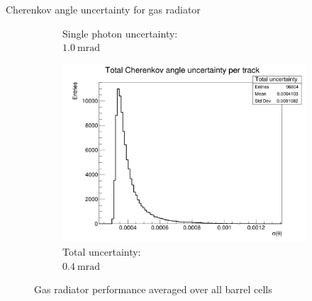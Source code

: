 \documentclass{beamer}
\begin{document}
\begin{frame}{Cherenkov angle uncertainty for gas radiator}
\begin{figure}
\begin{subfigure}{0.35\textwidth}
      \caption{Single photon uncertainty:\\ $\SI{1.0}{\milli\radian}$}
    \end{subfigure}%
    \begin{subfigure}{0.35\textwidth}
      \includegraphics[width = 1.0\textwidth]{Plots/TotalCherenkovUncertainty_Barrel_Gas.png}
      \vspace{-0.75cm}
      \caption{Total uncertainty:\\ $\SI{0.4}{\milli\radian}$}
    \end{subfigure}
    \vspace{-0.1cm}
    \caption{Gas radiator performance averaged over all barrel cells}
  \end{figure}
\end{frame}
\end{document}
